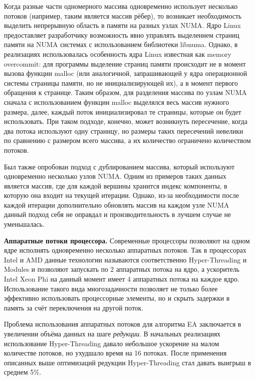 \documentclass[a4paper,10pt]{extarticle}
\begin{document}
Когда разные части одномерного массива одновременно использует несколько потоков (например,  таким является массив рёбер), то возникает необходимость выделить непрерывную область в памяти на разных узлах NUMA. Ядро Linux предоставляет разработчику возможность явно управлять выделением страниц памяти на NUMA системах с использованием библиотеки libnuma. Однако, в реализациях использовалась особенность ядра Linux известная как memory overcommit: для программы выделение страниц памяти происходит не в момент вызова функции malloc (или аналогичной, запрашивающей у ядра операционной системы страницы памяти, но не инициализирующей их), а в момент первого обращения к странице. Таким образом, для разделения массива по узлам NUMA сначала с использованием функции malloc выделялся весь массив нужного размера, далее, каждый поток инициализировал те страницы, которые он будет использовать. При таком подходе, конечно, может возникнуть пересечение, когда два потока используют одну страницу, но размеры таких пересечений невелики по сравнению с размером всего массива, а их количество ограничено количеством потоков.

Был также опробован подход с дублированием массива, который используют одновременно несколько узлов NUMA. Одним из примеров таких данных является массив, где для каждой вершины хранится индекс компоненты, в которую она входит на текущей итерации. Однако, из-за необходимости после каждой итерации дополнительно обновлять массив на каждом узле NUMA данный подход себя не оправдал и производительность в лучшем случае не уменьшалась.



\textbf{Аппаратные потоки процессора.}
Современные процессоры позволяют на одном ядре исполнять одновременно несколько аппаратных потоков. Так в процессорах Intel и AMD данные технологии называются соответственно Hyper-Threading и Modules и позволяют запускать по 2 аппаратных потока на ядро, а ускоритель Intel Xeon Phi на данный момент имеет 4 аппаратных потока на каждое ядро. Использование такого вида многозадачности позволяет не только более эффективно использовать процессорные элементы, но и скрыть задержки в память за счёт переключения на другой поток.

Проблема использования аппаратных потоков для алгоритма EA заключается в увеличении объёма данных на шаге \textit{редукции}. В начальных реализациях использование Hyper-Threading давало небольшое
ускорение на малом количестве потоков, но ухудшало время на 16 потоках. После применения описанных выше оптимизаций редукции Hyper-Threading стал давать выигрыш в среднем 5\%.
\end{document}
